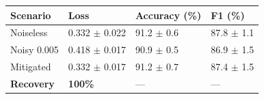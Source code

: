 \begin{tabular}{llll}
\toprule
Scenario & Loss & Accuracy (\%) & F1 (\%) \\
\midrule
Noiseless & 0.332 $\pm$ 0.022 & 91.2 $\pm$ 0.6 & 87.8 $\pm$ 1.1 \\
Noisy 0.005 & 0.418 $\pm$ 0.017 & 90.9 $\pm$ 0.5 & 86.9 $\pm$ 1.5 \\
Mitigated & 0.332 $\pm$ 0.017 & 91.2 $\pm$ 0.7 & 87.4 $\pm$ 1.5 \\
\textbf{Recovery} & \textbf{100\%} & --- & --- \\
\bottomrule
\end{tabular}
